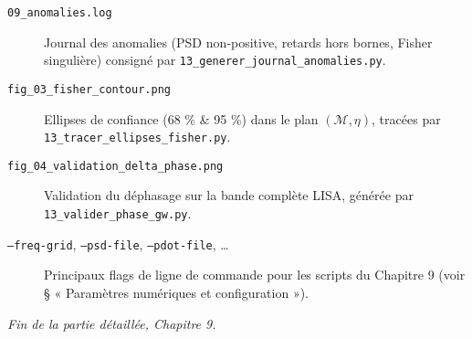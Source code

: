 \begin{description}
  \item[\texttt{09\_anomalies.log}]
    Journal des anomalies (PSD non‐positive, retards hors bornes, Fisher singulière) consigné par \texttt{13\_generer\_journal\_anomalies.py}.

  \item[\texttt{fig\_03\_fisher\_contour.png}]
    Ellipses de confiance (68 \% & 95 \%) dans le plan $(\mathcal{M},\eta)$, tracées par \texttt{13\_tracer\_ellipses\_fisher.py}.

  \item[\texttt{fig\_04\_validation\_delta\_phase.png}]
    Validation du déphasage sur la bande complète LISA, générée par \texttt{13\_valider\_phase\_gw.py}.

  \item[\texttt{--freq-grid}, \texttt{--psd-file}, \texttt{--pdot-file}, …]
    Principaux flags de ligne de commande pour les scripts du Chapitre 9 (voir § « Paramètres numériques et configuration »).
\end{description}


\bigskip
\noindent\emph{Fin de la partie détaillée, Chapitre 9.}
